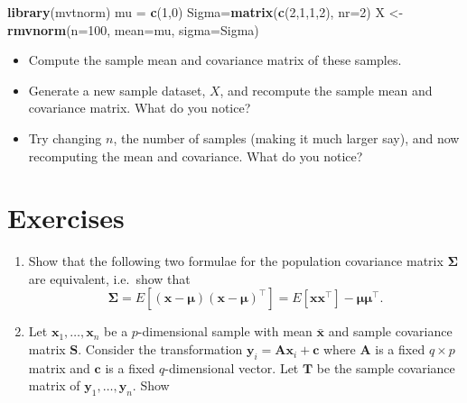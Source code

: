 \documentclass[]{book}
\newenvironment{Shaded}{\begin{snugshade}}{\end{snugshade}}
\newcommand{\DataTypeTok}[1]{\textcolor[rgb]{0.13,0.29,0.53}{#1}}
\newcommand{\DecValTok}[1]{\textcolor[rgb]{0.00,0.00,0.81}{#1}}
\newcommand{\KeywordTok}[1]{\textcolor[rgb]{0.13,0.29,0.53}{\textbf{#1}}}
\newcommand{\NormalTok}[1]{#1}
\newcommand{\StringTok}[1]{\textcolor[rgb]{0.31,0.60,0.02}{#1}}
\providecommand{\tightlist}{%
  \setlength{\itemsep}{0pt}\setlength{\parskip}{0pt}}
\theoremstyle{definition}
\theoremstyle{definition}
\theoremstyle{definition}
\theoremstyle{remark}
\begin{document}
\begin{Shaded}
\begin{Highlighting}[]
\KeywordTok{library}\NormalTok{(mvtnorm)}
\NormalTok{mu =}\StringTok{ }\KeywordTok{c}\NormalTok{(}\DecValTok{1}\NormalTok{,}\DecValTok{0}\NormalTok{)}
\NormalTok{Sigma=}\KeywordTok{matrix}\NormalTok{(}\KeywordTok{c}\NormalTok{(}\DecValTok{2}\NormalTok{,}\DecValTok{1}\NormalTok{,}\DecValTok{1}\NormalTok{,}\DecValTok{2}\NormalTok{), }\DataTypeTok{nr=}\DecValTok{2}\NormalTok{)}
\NormalTok{X <-}\StringTok{ }\KeywordTok{rmvnorm}\NormalTok{(}\DataTypeTok{n=}\DecValTok{100}\NormalTok{, }\DataTypeTok{mean=}\NormalTok{mu, }\DataTypeTok{sigma=}\NormalTok{Sigma)}
\end{Highlighting}
\end{Shaded}

\begin{itemize}
\tightlist
\item
  Compute the sample mean and covariance matrix of these samples.
\item
  Generate a new sample dataset, \(X\), and recompute the sample mean and covariance matrix. What do you notice?
\item
  Try changing \(n\), the number of samples (making it much larger say), and now recomputing the mean and covariance. What do you notice?
\end{itemize}

\hypertarget{exercises}{%
\section{Exercises}\label{exercises}}

\begin{enumerate}
\def\labelenumi{\arabic{enumi}.}
\item
  Show that the following two formulae for the population covariance matrix \(\boldsymbol \Sigma\) are equivalent, i.e.~show that
  \[\boldsymbol \Sigma= E[(\boldsymbol x- \boldsymbol \mu) (\boldsymbol x- \boldsymbol \mu)^\top ] = E[ \boldsymbol x\boldsymbol x^\top ] - \boldsymbol \mu\boldsymbol \mu^\top.\]
\item
  Let \(\boldsymbol x_1, \ldots, \boldsymbol x_n\) be a \(p\)-dimensional sample with mean \(\bar{\boldsymbol x}\) and sample covariance matrix \(\boldsymbol S\). Consider the transformation \(\boldsymbol y_i = \boldsymbol A\boldsymbol x_i + \boldsymbol c\) where \(\boldsymbol A\) is a fixed \(q \times p\) matrix and \(\boldsymbol c\) is a fixed \(q\)-dimensional vector. Let \(\boldsymbol T\) be the sample covariance matrix of \(\boldsymbol y_1, \ldots, \boldsymbol y_n\). Show
\end{enumerate}
\end{document}
